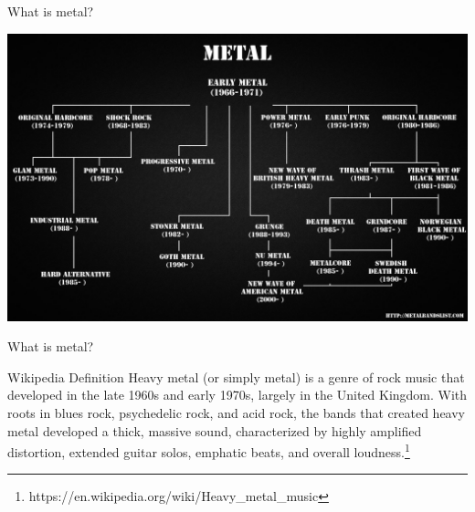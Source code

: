 \documentclass{beamer}
\begin{document}
    \begin{frame}{What is metal?}
      \pause
      \begin{center}
        \includegraphics[scale=.18]{familyTree}
      \end{center}
    \end{frame}

    \begin{frame}{What is metal?}

      \begin{block}{Wikipedia Definition}
        Heavy metal (or simply metal) is a genre of rock music that developed in the late 1960s
        and early 1970s, largely in the United Kingdom. With roots in blues rock, psychedelic rock,
        and acid rock, the bands that created heavy metal developed a thick, massive sound,
        characterized by highly amplified distortion, extended guitar solos, emphatic beats,
        and overall loudness.\footnote{https://en.wikipedia.org/wiki/Heavy\_metal\_music}
      \end{block}

    \end{frame}
\end{document}
